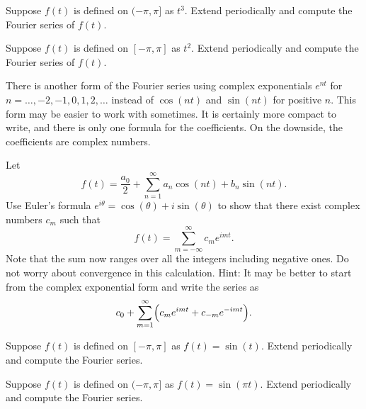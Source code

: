 \begin{exercise}
Suppose $f(t)$ is defined on $(-\pi,\pi]$ as $t^3$.
Extend periodically and compute the Fourier series of $f(t)$.
\end{exercise}

\begin{exercise}
Suppose $f(t)$ is defined on $[-\pi,\pi]$ as $t^2$.
Extend periodically and compute the Fourier series of $f(t)$.
\end{exercise}

There is another form of the Fourier series using complex exponentials
$e^{nt}$ for $n=\ldots,-2,-1,0,1,2,\ldots$ instead of
$\cos(nt)$ and $\sin(nt)$ for positive $n$.  This form may be easier
to work with sometimes.  It is certainly more compact to write,
and there is only one formula for the coefficients.  On the downside,
the coefficients are complex numbers.

\begin{exercise}
\begin{samepage}
Let 
\begin{equation*}
f(t) = \frac{a_0}{2} + \sum_{n=1}^\infty a_n \cos (n t)
+ b_n \sin (n t) .
\end{equation*}
Use Euler's formula $e^{i\theta} = \cos (\theta) + i \sin (\theta)$ to
show that there exist complex numbers $c_m$ such that
\begin{equation*}
f(t) = 
\sum_{m=-\infty}^\infty c_m e^{imt} .
\end{equation*}
Note that the sum now ranges over all the integers including negative ones.
Do not worry about convergence in this calculation.
Hint: It may be better to start from the complex exponential form and write
the series as
\begin{equation*}
c_0 + \sum_{m=1}^\infty \Bigl( c_m e^{imt} + c_{-m} e^{-imt}  \Bigr).
\end{equation*}
\end{samepage}
\end{exercise}

\setcounter{exercise}{100}

\begin{exercise}
Suppose $f(t)$ is defined on $[-\pi,\pi]$ as $f(t) = \sin(t)$.  Extend
periodically and compute the Fourier series.
\end{exercise}

\begin{exercise}
Suppose $f(t)$ is defined on $(-\pi,\pi]$ as $f(t) = \sin(\pi t)$.  Extend
periodically and compute the Fourier series.
\end{exercise}

